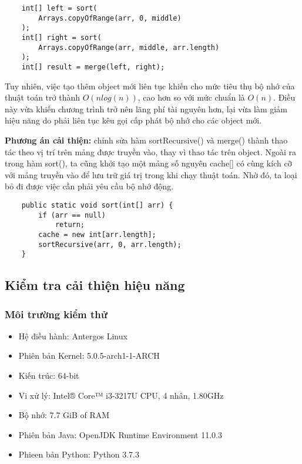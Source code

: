 \documentclass{article}
\begin{document}
    \begin{lstlisting}
    int[] left = sort(
        Arrays.copyOfRange(arr, 0, middle)
    );
    int[] right = sort(
        Arrays.copyOfRange(arr, middle, arr.length)
    );
    int[] result = merge(left, right);
    \end{lstlisting}

    Tuy nhiên, việc tạo thêm object mới liên tục khiến cho mức tiêu thụ bộ nhớ của 
    thuật toán trở thành $O(nlog(n))$, cao hơn so với mức chuẩn là $O(n)$. Điều này vừa khiến chương 
    trình trở nên lãng phí tài nguyên hơn, lại vừa làm giảm hiệu năng do phải liên tục kêu gọi cấp phát 
    bộ nhớ cho các object mới.

    \textbf{Phương án cải thiện:} chỉnh sửa hàm sortRecursive() và merge() thành thao
    tác theo vị trí trên mảng được truyền vào, thay vì thao tác trên object. Ngoài ra trong hàm sort(),
    ta cũng khởi tạo một mảng số nguyên cache[] có cùng kích cỡ với mảng truyền vào để lưu trữ giá trị 
    trong khi chạy thuật toán. Nhờ đó, ta loại bỏ đi được việc cần phải yêu cầu bộ nhớ
    động.

    \begin{lstlisting}
    public static void sort(int[] arr) {
        if (arr == null)
            return;
        cache = new int[arr.length];
        sortRecursive(arr, 0, arr.length);
    }
    \end{lstlisting}


    \subsection{Kiểm tra cải thiện hiệu năng}
    \subsubsection{Môi trường kiểm thử}
    \begin{itemize}
        \item Hệ điều hành: Antergos Linux 
        \item Phiên bản Kernel: 5.0.5-arch1-1-ARCH
        \item Kiến trúc: 64-bit
        \item Vi xử lý: Intel® Core™ i3-3217U CPU, 4 nhân, 1.80GHz
        \item Bộ nhớ: 7.7 GiB of RAM
        \item Phiên bản Java: OpenJDK Runtime Environment 11.0.3
        \item Phieen bản Python: Python 3.7.3
    \end{itemize}
\end{document}
